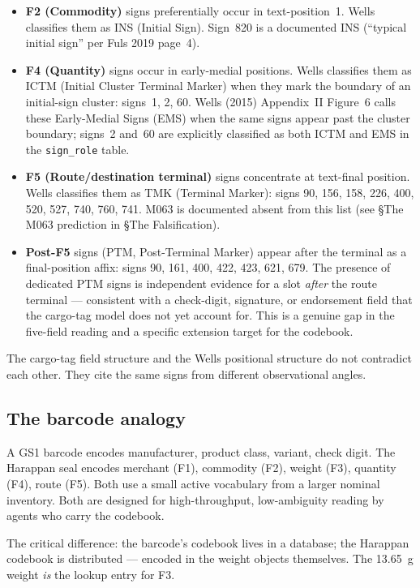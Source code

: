 \begin{itemize}
\item \textbf{F2 (Commodity)} signs preferentially occur in
  text-position~1. Wells classifies them as INS (Initial Sign).
  Sign~820 is a documented INS (``typical initial sign'' per
  Fuls 2019 page~4).
\item \textbf{F4 (Quantity)} signs occur in early-medial positions.
  Wells classifies them as ICTM (Initial Cluster Terminal Marker)
  when they mark the boundary of an initial-sign cluster: signs~1,
  2, 60. Wells (2015) Appendix~II Figure~6 calls these
  Early-Medial Signs (EMS) when the same signs appear past the
  cluster boundary; signs~2 and~60 are explicitly classified as
  both ICTM and EMS in the \texttt{sign\_role} table.
\item \textbf{F5 (Route/destination terminal)} signs concentrate at
  text-final position. Wells classifies them as TMK (Terminal
  Marker): signs 90, 156, 158, 226, 400, 520, 527, 740, 760, 741.
  M063 is documented absent from this list (see §The M063
  prediction in §The Falsification).
\item \textbf{Post-F5} signs (PTM, Post-Terminal Marker) appear
  after the terminal as a final-position affix: signs 90, 161,
  400, 422, 423, 621, 679. The presence of dedicated PTM signs
  is independent evidence for a slot \emph{after} the route
  terminal --- consistent with a check-digit, signature, or
  endorsement field that the cargo-tag model does not yet
  account for. This is a genuine gap in the five-field reading
  and a specific extension target for the codebook.
\end{itemize}

The cargo-tag field structure and the Wells positional structure
do not contradict each other. They cite the same signs from
different observational angles.

\subsection{The barcode analogy}

A GS1 barcode encodes manufacturer, product class, variant, check
digit. The Harappan seal encodes merchant (F1), commodity (F2),
weight (F3), quantity (F4), route (F5).
Both use a small active vocabulary from a larger nominal inventory.
Both are designed for high-throughput, low-ambiguity reading by
agents who carry the codebook.

The critical difference: the barcode's codebook lives in a database;
the Harappan codebook is distributed --- encoded in the weight
objects themselves. The \SI{13.65}{\gram} weight \emph{is} the
lookup entry for F3.

